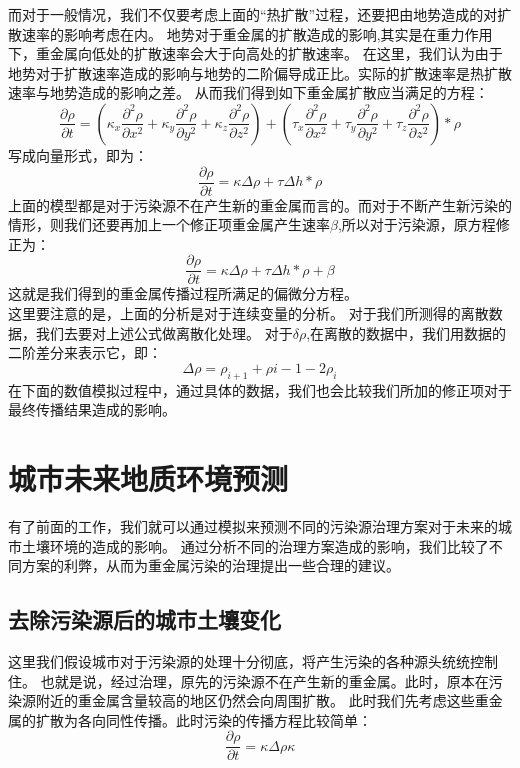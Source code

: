 \documentclass[a4paper]{article}
\begin{document}
\indent 而对于一般情况，我们不仅要考虑上面的“热扩散”过程，还要把由地势造成的对扩散速率的影响考虑在内。
地势对于重金属的扩散造成的影响,其实是在重力作用下，重金属向低处的扩散速率会大于向高处的扩散速率。
在这里，我们认为由于地势对于扩散速率造成的影响与地势的二阶偏导成正比。实际的扩散速率是热扩散速率与地势造成的影响之差。
从而我们得到如下重金属扩散应当满足的方程：
\begin{equation}
\frac{\partial \rho}{\partial t} 
= (\kappa_x\frac{\partial^2 \rho}{\partial x^2}+\kappa_y\frac{\partial^2 \rho}{\partial y^2}+\kappa_z\frac{\partial^2 \rho}{\partial z^2})
+( \tau_x\frac{\partial^2 \rho}{\partial x^2}+\tau_y\frac{\partial^2 \rho}{\partial y^2}+\tau_z\frac{\partial^2 \rho}{\partial z^2})*\rho
\end{equation}
写成向量形式，即为：
\begin{equation}
\frac{\partial \rho}{\partial t} = \kappa \Delta \rho + \tau \Delta h *\rho
\end{equation}
上面的模型都是对于污染源不在产生新的重金属而言的。而对于不断产生新污染的情形，则我们还要再加上一个修正项重金属产生速率$\beta$,所以对于污染源，原方程修正为：
\begin{equation}
\label{eqn_model}
\frac{\partial \rho}{\partial t} = \kappa \Delta \rho + \tau \Delta h *\rho + \beta
\end{equation}
这就是我们得到的重金属传播过程所满足的偏微分方程。  \\
\indent 这里要注意的是，上面的分析是对于连续变量的分析。
对于我们所测得的离散数据，我们去要对上述公式做离散化处理。
对于$\delta \rho $,在离散的数据中，我们用数据的二阶差分来表示它，即：
\begin{equation}
\Delta \rho= \rho_{i+1}+\rho{i-1}-2\rho_i
\end{equation}
在下面的数值模拟过程中，通过具体的数据，我们也会比较我们所加的修正项对于最终传播结果造成的影响。


\section{城市未来地质环境预测}
有了前面的工作，我们就可以通过模拟来预测不同的污染源治理方案对于未来的城市土壤环境的造成的影响。
通过分析不同的治理方案造成的影响，我们比较了不同方案的利弊，从而为重金属污染的治理提出一些合理的建议。

\subsection{去除污染源后的城市土壤变化}
这里我们假设城市对于污染源的处理十分彻底，将产生污染的各种源头统统控制住。
也就是说，经过治理，原先的污染源不在产生新的重金属。此时，原本在污染源附近的重金属含量较高的地区仍然会向周围扩散。
此时我们先考虑这些重金属的扩散为各向同性传播。此时污染的传播方程比较简单：
\begin{equation}
\frac{\partial \rho}{\partial t} = \kappa  \Delta \rho\kappa  
\end{equation}
\end{document}
